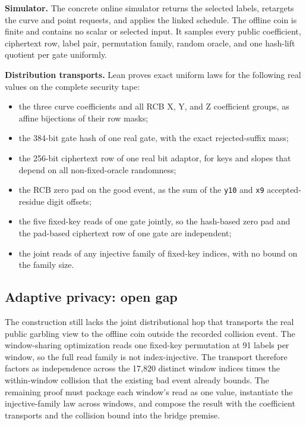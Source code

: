\documentclass[10pt]{article}
\begin{document}
\textbf{Simulator.}
The concrete online simulator returns the selected labels, retargets the curve and point requests, and applies the linked schedule.
The offline coin is finite and contains no scalar or selected input.
It samples every public coefficient, ciphertext row, label pair, permutation family, random oracle, and one hash-lift quotient per gate uniformly.

\textbf{Distribution transports.}
Lean proves exact uniform laws for the following real values on the complete security tape:
\begin{itemize}
  \item the three curve coefficients and all RCB X, Y, and Z coefficient groups, as affine bijections of their row masks;
  \item the 384-bit gate hash of one real gate, with the exact rejected-suffix mass;
  \item the 256-bit ciphertext row of one real bit adaptor, for keys and slopes that depend on all non-fixed-oracle randomness;
  \item the RCB zero pad on the good event, as the sum of the \texttt{y10} and \texttt{x9} accepted-residue digit offsets;
  \item the five fixed-key reads of one gate jointly, so the hash-based zero pad and the pad-based ciphertext row of one gate are independent;
  \item the joint reads of any injective family of fixed-key indices, with no bound on the family size.
\end{itemize}

\subsection{Adaptive privacy: open gap}

The construction still lacks the joint distributional hop that transports the real public garbling view to the offline coin outside the recorded collision event.
The window-sharing optimization reads one fixed-key permutation at 91 labels per window, so the full read family is not index-injective.
The transport therefore factors as independence across the 17,820 distinct window indices times the within-window collision that the existing bad event already bounds.
The remaining proof must package each window's read as one value, instantiate the injective-family law across windows, and compose the result with the coefficient transports and the collision bound into the bridge premise.
\end{document}
